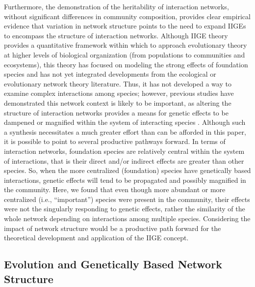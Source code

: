 \documentclass[fleqn,12pt]{olplainarticle}
\begin{document}
Furthermore, the demonstration of the heritability of interaction
networks, without significant differences in community composition,
provides clear empirical evidence that variation in network structure
points to the need to expand IIGEs to encompass the structure of
interaction networks. Although IIGE theory provides a quantitative
framework within which to approach evolutionary theory at higher
levels of biological organization (from populations to communities and
ecosystems), this theory has focused on modeling the strong effects of
foundation species \citep{Shuster2006COMMUNITYSTRUCTURE, Whitham2012,
  Whitham2020IntraspecificEvolution} and has not yet integrated
developments from the ecological or evolutionary network theory
literature. Thus, it has not developed a way to examine complex
interactions among species; however, previous studies have
demonstrated this network context is likely to be important, as
altering the structure of interaction networks provides a means for
genetic effects to be dampened or magnified within the system of
interacting species \citep{Smith2011, Keith2017}. Although such a
synthesis necessitates a much greater effort than can be afforded in
this paper, it is possible to point to several productive pathways
forward. In terms of interaction networks, foundation species are
relatively central within the system of interactions, that is their
direct and/or indirect effects are greater than other species. So,
when the more centralized (foundation) species have genetically based
interactions, genetic effects will tend to be propagated and possibly
magnified in the community. Here, we found that even though more
abundant or more centralized (i.e., ``important'') species were
present in the community, their effects were not the singularly
responding to genetic effects, rather the similarity of the whole
network depending on interactions among multiple species. Considering
the impact of network structure would be a productive path forward for
the theoretical development and application of the IIGE concept.


\subsection*{Evolution and Genetically Based Network Structure}
\end{document}
